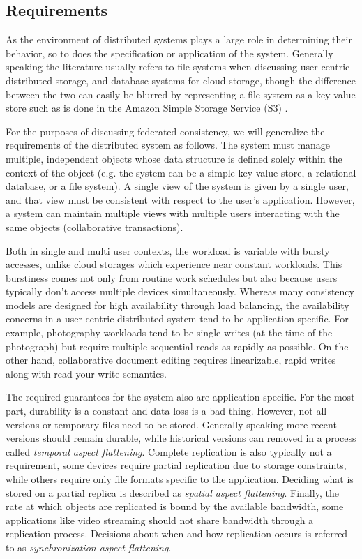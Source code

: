 \documentclass[letterpaper,twocolumn,10pt]{article}
\begin{document}
\subsection{Requirements}

As the environment of distributed systems plays a large role in determining their behavior, so to does the specification or application of the system. Generally speaking the literature usually refers to file systems when discussing user centric distributed storage, and database systems for cloud storage, though the difference between the two can easily be blurred by representing a file system as a key-value store such as is done in the Amazon Simple Storage Service (S3) \cite{bermbach_eventual_2011}.

For the purposes of discussing federated consistency, we will generalize the requirements of the distributed system as follows. The system must manage multiple, independent objects whose data structure is defined solely within the context of the object (e.g. the system can be a simple key-value store, a relational database, or a file system). A single view of the system is given by a single user, and that view must be consistent with respect to the user's application. However, a system can maintain multiple views with multiple users interacting with the same objects (collaborative transactions).

Both in single and multi user contexts, the workload is variable with bursty accesses, unlike cloud storages which experience near constant workloads. This burstiness comes not only from routine work schedules but also because users typically don't access multiple devices simultaneously. Whereas many consistency models are designed for high availability through load balancing, the availability concerns in a user-centric distributed system tend to be application-specific. For example, photography workloads tend to be single writes (at the time of the photograph) but require multiple sequential reads as rapidly as possible. On the other hand, collaborative document editing requires linearizable, rapid writes along with read your write semantics.

The required guarantees for the system also are application specific. For the most part, durability is a constant and data loss is a bad thing. However, not all versions or temporary files need to be stored. Generally speaking more recent versions should remain durable, while historical versions can removed in a process called \textit{temporal aspect flattening}. Complete replication is also typically not a requirement, some devices require partial replication due to storage constraints, while others require only file formats specific to the application. Deciding what is stored on a partial replica is described as \textit{spatial aspect flattening}.  Finally, the rate at which objects are replicated is bound by the available bandwidth, some applications like video streaming should not share bandwidth through a replication process. Decisions about when and how replication occurs is referred to as \textit{synchronization aspect flattening}.
\end{document}
